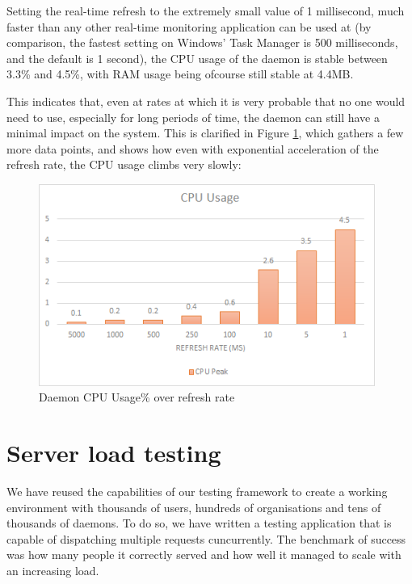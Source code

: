 \documentclass{l3proj}
\begin{document}
Setting the real-time refresh to the extremely small value of 1 millisecond, much faster than any other real-time monitoring application can be used at (by comparison, the fastest setting on Windows' Task Manager is 500 milliseconds, and the default is 1 second), the CPU usage of the daemon is stable between 3.3\% and 4.5\%, with RAM usage being ofcourse still stable at 4.4MB. 

This indicates that, even at rates at which it is very probable that no one would need to use, especially for long periods of time, the daemon can still have a minimal impact on the system. This is clarified in Figure \ref{fig:DaemonEvalGraph}, which gathers a few more data points, and shows how even with exponential acceleration of the refresh rate, the CPU usage climbs very slowly:

\begin{figure}[H]
\centering
\includegraphics[width=110mm]{images/daemonusage}
\caption{Daemon CPU Usage\% over refresh rate}
\label{fig:DaemonEvalGraph}
\end{figure}


\section{Server load testing}

We have reused the capabilities of our testing framework to create a working environment with thousands of users, hundreds of organisations and tens of thousands of daemons. To do so, we have written a testing application that is capable of dispatching multiple requests cuncurrently. The benchmark of success was how many people it correctly served and how well it managed to scale with an increasing load.
\end{document}

